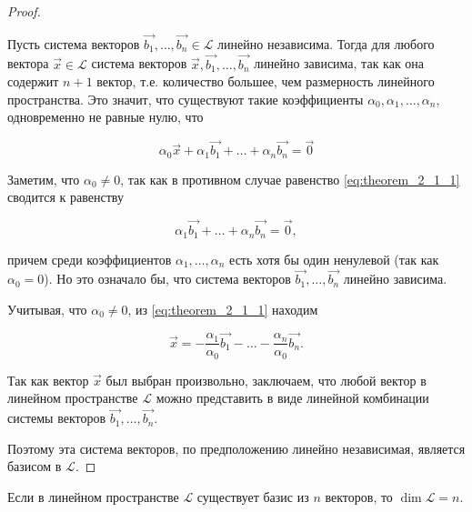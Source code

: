\begin{proof}~

    Пусть система векторов $\vec{b_1}, \ldots, \vec{b_n} \in \mathcal{L}$ линейно независима. Тогда для любого вектора $\vec{x} \in \mathcal{L}$ система векторов $\vec{x}, \vec{b_1}, \ldots, \vec{b_n}$ линейно зависима, так как она содержит $n + 1$ вектор, т.е. количество большее, чем размерность линейного пространства. Это значит, что существуют такие коэффициенты $\alpha_0, \alpha_1, \ldots, \alpha_n$, одновременно не равные нулю, что

    \begin{equation}
        \alpha_0\vec{x} + \alpha_1\vec{b_1} + \ldots + \alpha_n\vec{b_n} = \vec{0}
        \label{eq:theorem_2_1_1}
    \end{equation}

    Заметим, что $\alpha_0 \ne 0$, так как в противном случае равенство \eqref{eq:theorem_2_1_1} сводится к равенству

    \begin{equation}
        \alpha_1\vec{b_1} + \ldots + \alpha_n\vec{b_n} = \vec{0},
    \end{equation}

    причем среди коэффициентов $\alpha_1, \ldots, \alpha_n$ есть хотя бы один ненулевой (так как $\alpha_0 = 0$). Но это означало бы, что система векторов $\vec{b_1}, \ldots, \vec{b_n}$ линейно зависима. 
    
    Учитывая, что $\alpha_0 \ne 0$, из \eqref{eq:theorem_2_1_1} находим

    \begin{equation}
        \vec{x} = -\frac{\alpha_1}{\alpha_0}\vec{b_1} - \ldots - \frac{\alpha_n}{\alpha_0}\vec{b_n}.
    \end{equation}

    Так как вектор $\vec{x}$ был выбран произвольно, заключаем, что любой вектор в линейном пространстве $\mathcal{L}$ можно представить в виде линейной комбинации системы векторов $\vec{b_1}, \ldots, \vec{b_n}$.

    Поэтому эта система векторов, по предположению линейно независимая, является базисом в $\mathcal{L}$.
\end{proof}

\begin{theorem}[обратная]
    Если в линейном пространстве $\mathcal{L}$ существует базис из $n$ векторов, то $\dim \mathcal{L} = n$.
    \label{thm:theorem_2_2}
\end{theorem}


